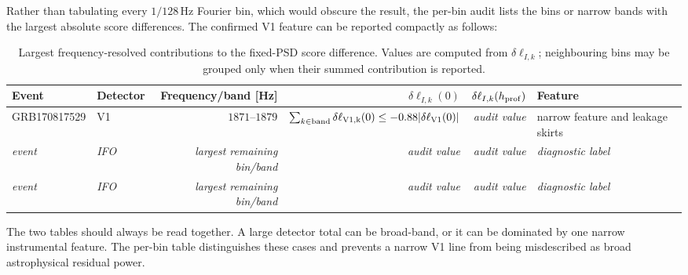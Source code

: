 Rather than tabulating every $1/128\,\mathrm{Hz}$ Fourier bin, which would
obscure the result, the per-bin audit lists the bins or narrow bands with the
largest absolute score differences. The confirmed V1 feature can be reported
compactly as follows:
\begin{table}[ht]
\centering
\small
\caption{Largest frequency-resolved contributions to the fixed-PSD score
difference. Values are computed from $\delta\ell_{I,k}$; neighbouring bins
may be grouped only when their summed contribution is reported.}
\begin{tabular}{llrrrl}
\toprule
\textbf{Event} & \textbf{Detector} & \textbf{Frequency/band [Hz]}
& \textbf{$\delta\ell_{I,k}(0)$} & \textbf{$\delta\ell_{I,k}(h_{\rm prof})$}
& \textbf{Feature}\\
\midrule
GRB170817529 & V1 & $1871$--$1879$ &
$\sum_{k\in\mathrm{band}}\delta\ell_{\rm V1,k}(0)
\leq-0.88\lvert\delta\ell_{\rm V1}(0)\rvert$
& \textit{audit value} & narrow feature and leakage skirts\\
\textit{event} & \textit{IFO} & \textit{largest remaining bin/band}
& \textit{audit value} & \textit{audit value} & \textit{diagnostic label}\\
\textit{event} & \textit{IFO} & \textit{largest remaining bin/band}
& \textit{audit value} & \textit{audit value} & \textit{diagnostic label}\\
\bottomrule
\end{tabular}
\end{table}

The two tables should always be read together. A large detector total can be
broad-band, or it can be dominated by one narrow instrumental feature. The
per-bin table distinguishes these cases and prevents a narrow V1 line from
being misdescribed as broad astrophysical residual power.
